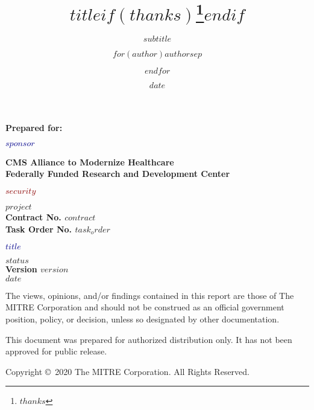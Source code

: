\documentclass[12pt,letter,twoside]{article}
\title{$title$$if(thanks)$\thanks{$thanks$}$endif$}
\subtitle{$subtitle$}
\author{$for(author)$$author$$sep$ \and $endfor$}
\institute{$for(institute)$$institute$$sep$ \and $endfor$}
\date{$date$}
\begin{document}
\frontmatter

\begin{titlepage}
\raggedright
{
\Large
\textsf{\textbf{Prepared for:}}\par
}
\vspace{20pt}
{
\huge
\textsf{\textbf{\textcolor{DarkBlue}{$sponsor$}}}\par
}
\vspace{20pt}
{
\Large
\textsf{\textbf{CMS Alliance to Modernize Healthcare}}\\
\textsf{\textbf{Federally Funded Research and Development Center}}\par
}
\vspace{20pt}
{
\Large
\textsf{\textbf{\textcolor{DarkRed}{$security$}}}\par
}
\vspace{20pt}
{
\Large
\textsf{\textbf{$project$}}\\
\vspace{5pt}
\textsf{\textbf{Contract No. $contract$}}\\
\vspace{5pt}
\textsf{\textbf{Task Order No. $task_order$}}\par
}
\vspace{30pt}
{
\Huge
\textsf{\textbf{\textcolor{DarkBlue}{$title$}}}\par
}
\vspace{30pt}
{
\Large
\textsf{\textbf{$status$}}\\
\vspace{5pt}
\textsf{\textbf{Version $version$}}\\
\vspace{5pt}
\textsf{\textbf{$date$}}\par
}

\vspace{40pt}

{
\textsf{The views, opinions, and/or findings contained in this report are those of The MITRE Corporation and should not be construed as an official government position, policy, or decision, unless so designated by other documentation.}

\textsf{This document was prepared for authorized distribution only. It has not been approved for public release.}

\textsf{Copyright \copyright\ 2020 The MITRE Corporation. All Rights Reserved.}
}
\end{titlepage}

\pagestyle{fancy}
\renewcommand{\sectionmark}[1]{\markright{\thesection.\ #1}{}}
\fancyhf{}
\fancyhead[LE,RO]{}
\renewcommand{\headrulewidth}{0.4pt}
\renewcommand{\footrulewidth}{0.4pt}
\fancypagestyle{plain}{
  \fancyhf{}
  \renewcommand{\footrulewidth}{0pt}
  \renewcommand{\headrulewidth}{0pt}
}
\end{document}
